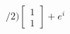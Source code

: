 \documentclass[preview]{standalone}
\begin{document}
\begin{align*}
/2) \begin{bmatrix} 1 \\ 1\end{bmatrix} + e^{i}
\end{align*}
\end{document}
